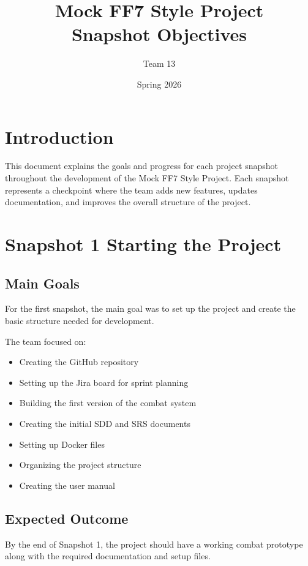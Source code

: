 \documentclass{article}
\title{Mock FF7 Style Project \\ Snapshot Objectives}
\author{Team 13}
\date{Spring 2026}
\begin{document}
\maketitle

\tableofcontents
\newpage

\section{Introduction}

This document explains the goals and progress for each project snapshot
throughout the development of the Mock FF7 Style Project.
Each snapshot represents a checkpoint where the team adds new features,
updates documentation, and improves the overall structure of the project.

\section{Snapshot 1 Starting the Project}

\subsection{Main Goals}

For the first snapshot, the main goal was to set up the project and create
the basic structure needed for development.

The team focused on:

\begin{itemize}
\item Creating the GitHub repository
\item Setting up the Jira board for sprint planning
\item Building the first version of the combat system
\item Creating the initial SDD and SRS documents
\item Setting up Docker files
\item Organizing the project structure
\item Creating the user manual
\end{itemize}

\subsection{Expected Outcome}

By the end of Snapshot 1, the project should have a working
combat prototype along with the required documentation and setup files.
\end{document}
